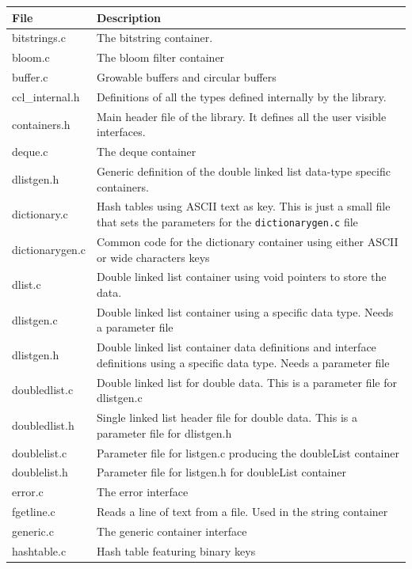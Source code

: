 \documentclass[12pt,a4paper]{memoir} %
\begin{document}
{{{\small
\begin{longtable}{||p{3.5cm}|p{11cm}||}
\hline
\textbf{File}&\textbf{Description}\\\hline \hline 
bitstrings.c&The bitstring container.\\\hline
bloom.c&The bloom filter container\\\hline
buffer.c&Growable buffers and circular buffers\\\hline
ccl\_internal.h&Definitions of all the types defined internally by the library.\\\hline
containers.h&Main header file of the library. It defines all the user visible interfaces.\\\hline
deque.c&The deque container\\\hline
dlistgen.h&Generic definition of the double linked list data-type specific containers.\\\hline
dictionary.c&Hash tables using ASCII text as key. This is just a small file that sets the parameters for the \verb,dictionarygen.c, file\\\hline
dictionarygen.c&Common code for the dictionary container using either ASCII or wide characters keys\\\hline
dlist.c&Double linked list container using void pointers to store the data.\\\hline
dlistgen.c&Double linked list container using a specific data type. Needs a parameter file\\\hline
dlistgen.h&Double linked list container data definitions and interface definitions using a specific data type. Needs a parameter file\\\hline
doubledlist.c&Double linked list for double data. This is a parameter file for dlistgen.c\\\hline
doubledlist.h&Single linked list header file for double data. This is a parameter file for dlistgen.h\\\hline
doublelist.c& Parameter file for listgen.c producing the doubleList container\\\hline
doublelist.h&Parameter file for listgen.h for doubleList container\\\hline
error.c&The error interface\\\hline
fgetline.c&Reads a line of text from a file. Used in the string container\\\hline
generic.c&The generic container interface\\\hline
hashtable.c&Hash table featuring binary keys\\\hline

\end{longtable}}}}
\end{document}
